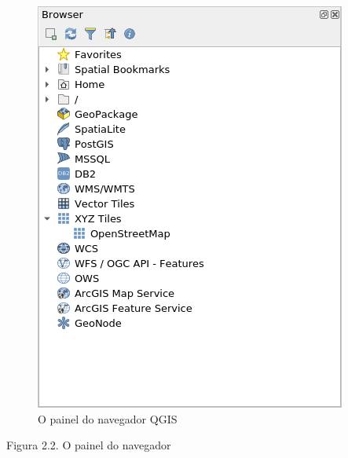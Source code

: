\documentclass[
]{krantz}
\begin{document}
\begin{figure}
\centering
\includegraphics{media/modulo2/qgis-browser-1.png}
\caption{O painel do navegador QGIS}
\end{figure}

Figura 2.2. O painel do navegador
\end{document}

